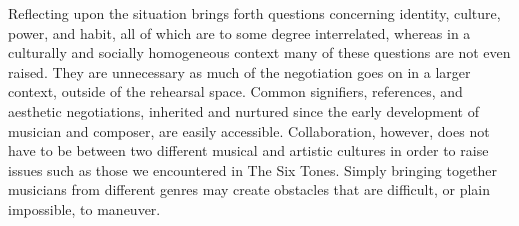\documentclass[a4paper]{article}
\begin{document}

Reflecting upon the situation brings forth questions concerning identity, culture, power, and habit, all of which are to some degree interrelated, whereas in a culturally and socially homogeneous context many of these questions are not even raised. They are unnecessary as much of the negotiation goes on in a larger context, outside of the rehearsal space. Common signifiers, references, and aesthetic negotiations, inherited and nurtured since the early development of musician and composer, are easily accessible. Collaboration, however, does not have to be between two different musical and artistic cultures in order to raise issues such as those we encountered in The Six Tones. Simply bringing together musicians from different genres may create obstacles that are difficult, or plain impossible, to maneuver. 
\end{document}
